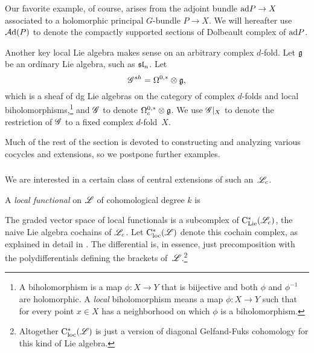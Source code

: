\begin{eg}
Our favorite example, of course, arises from the adjoint bundle ${\rm ad}{P} \to X$ associated to a holomorphic principal $G$-bundle $P \to X$. 
We will hereafter use $\mathcal A{\rm d}(P)$ to denote the compactly supported sections of Dolbeault complex of ${\rm ad}{P}$.
\end{eg}

\begin{eg}
Another key local Lie algebra makes sense on an arbitrary complex $d$-fold.
Let $\mathfrak g$ be an ordinary Lie algebra, such as ${\frak{s}\frak{l}}_n$.
Let
\[
\mathscr G^{sh} = \Omega^{0,*} \otimes \mathfrak g,
\]
which is a sheaf of dg Lie algebras on the category of complex $d$-folds and local biholomorphisms,\footnote{A biholomorphism is a map $\phi: X \to Y$ that is biijective and both $\phi$ and $\phi^{-1}$ are holomorphic. A {\em local} biholomorphism means a map $\phi: X \to Y$ such that for every point $x \in X$ has a neighborhood on which $\phi$ is a biholomorphism.
}
and $\mathscr G$ to denote $\Omega^{0,*}_c \otimes \mathfrak g$.
We use $\mathscr G|_X$ to denote the restriction of $\mathscr G$ to a fixed complex $d$-fold~$X$.
\end{eg}

Much of the rest of the section is devoted to constructing and analyzing various cocycles and extensions,
so we postpone further examples.

\subsubsection{}

We are interested in a certain class of central extensions of such an~$\mathscr L_c$.

\begin{dfn}
A {\em local functional} on $\mathscr L$ of cohomological degree $k$ is  
\end{dfn}

The graded vector space of local functionals is a subcomplex of ${\rm C}_{\rm Lie}^*(\mathscr L_c)$, 
the naive Lie algebra cochains of $\mathscr L_c$.
Let ${\rm C}_{\rm loc}^*(\mathscr L)$ denote this cochain complex, as explained in detail in .
The differential is, in essence, just precomposition with the polydifferentials defining the brackets of~$\mathscr L$.\footnote{Altogether ${\rm C}_{\rm loc}^*(\mathscr L)$ is just a version of diagonal Gelfand-Fuks cohomology for this kind of Lie algebra.} 

